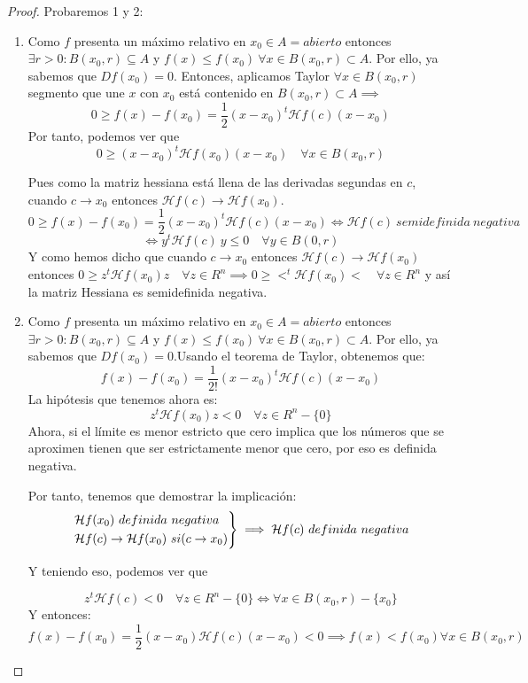 \begin{proof} Probaremos 1 y 2:
	\begin{enumerate}
	\item Como $f$ presenta un máximo relativo en $x_0\in A=abierto$ entonces $\exists r > 0 : B(x_0,r) \subseteq A $ y $f(x) \leq f(x_0) \ \forall x \in B(x_0,r)\subset A$. Por ello, ya sabemos que $Df(x_0) = 0$. Entonces, aplicamos Taylor $\forall x \in B(x_0,r)$ segmento que une $x$ con $x_0$ está contenido en $B(x_0,r) \subset A \implies $
	\[
	0 \geq f(x) - f(x_0) =  \frac{1}{2}(x-x_0)^t \mathcal{H}f(c)(x-x_0)
	\]
	Por tanto, podemos ver que
	\[
	0 \geq (x-x_0)^t \mathcal{H}f(x_0)(x-x_0) \quad \forall x \in B(x_0,r)
	\]

	Pues como la matriz hessiana está llena de las derivadas segundas en $c$, cuando $c \to x_0$ entonces $\mathcal{H}f(c) \to \mathcal{H}f(x_0)$.
\[
	0 \geq f(x) - f(x_0) =  \frac{1}{2}(x-x_0)^t \mathcal{H}f(c)(x-x_0) \iff \mathcal{H}f(c) \ semidefinida \ negativa
	\]
	\[
	 \iff y^t\mathcal{H}f(c) \ y \leq 0 \quad \forall y \in B(0,r)
	\]
	Y como hemos dicho que cuando $c \to x_0$ entonces $\mathcal{H}f(c) \to \mathcal{H}f(x_0)$ entonces $0 \geq z^t \mathcal{H}f(x_0)z \quad \forall z \in R^n \implies 0 \geq <^t \mathcal{H}f(x_0)< \quad \forall z \in R^n$ y así la matriz Hessiana es semidefinida negativa.

	\item Como $f$ presenta un máximo relativo en $x_0\in A=abierto$ entonces $\exists r > 0 : B(x_0,r) \subseteq A $ y $f(x) \leq f(x_0) \ \forall x \in B(x_0,r)\subset A$. Por ello, ya sabemos que $Df(x_0) = 0$.Usando el teorema de Taylor, obtenemos que:
	\[
	f(x)-f(x_0) = \frac{1}{2!}(x-x_0)^t \mathcal{H}f(c)(x-x_0)
	\]
	La hipótesis que tenemos ahora es:
	\[
	z^t \mathcal{H}f(x_0)z < 0 \quad \forall z \in R^n-\{0\}
	\]
	Ahora, si el límite es menor estricto que cero implica que los números que se aproximen tienen que ser estrictamente menor que cero, por eso es definida negativa.

	Por tanto, tenemos que demostrar la implicación:
	\[
	\begin{rcases}
	\mathcal{H}f(x_0) \ definida \ negativa\\
	\mathcal{H}f(c) \to \mathcal{H}f(x_0) \ si (c \to x_0)
\end{rcases} \implies \mathcal{H}f(c) \ definida \ negativa
	\]

	Y teniendo eso, podemos ver que

	\[
	z^t \mathcal{H}f(c) < 0 \quad \forall z \in R^n-\{0\} \iff \forall x \in B(x_0,r)-\{x_0\}
	\]
	Y entonces:
	\[
	f(x) - f(x_0) =  \frac{1}{2}(x-x_0)\mathcal{H}f(c)(x-x_0) < 0 \implies f(x) < f(x_0) \forall x \in B(x_0,r)
	\]
\end{enumerate}
\end{proof}


